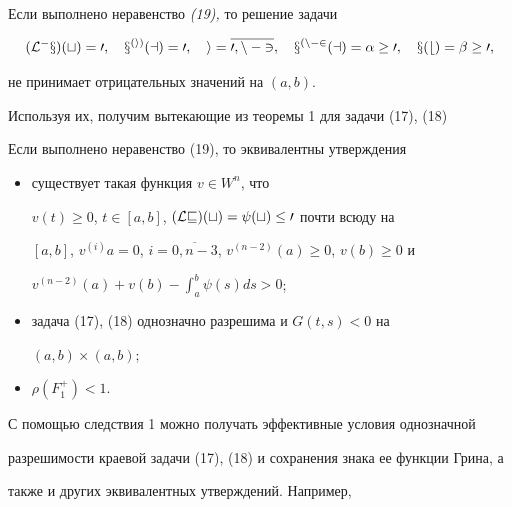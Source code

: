  


\begin{assrt} Если выполнено неравенство {\em (19),} то решение задачи 


$$ 


(\cal L^-x)(t)=0,\quad x^{(i)}(a)=0,\quad i=\overline{0,n-3}, 


\quad x^{(n-2}(a)=\alpha\ge 0,\quad x(b)=\beta\ge 0, 


$$ 


не принимает отрицательных значений на $(a,b)$. 


\end{assrt} 


 


Используя их, получим вытекающие из теоремы 1 для задачи (17), (18) 


 


\begin{cor} Если выполнено неравенство (19), то эквивалентны утверждения 


\begin{itemize} 


\item[1)] существует такая функция $v\in W^n$, что 


$v(t)\ge 0$, $t\in[a,b]$, $(\cal Lv)(t)=\psi(t)\le 0$ почти всюду на 


$[a,b]$, $v^{(i)}a=0$, $i=\overline{0,n-3}$, $v^{(n-2)}(a)\ge 0$, $v(b)\ge 0$ и 


$v^{(n-2)}(a)+v(b)-\int^b_a\psi(s)ds>0$;


\item[2)] задача (17), (18) однозначно разрешима и $G(t,s)<0$ на 


$(a,b)\times(a,b)$; 


\item[3)] $\rho(F^+_1)<1$. 


\end{itemize} 


\end{cor} 


 


С помощью следствия 1 можно получать эффективные условия однозначной 


разрешимости краевой задачи (17), (18) и сохранения знака ее функции Грина, а 


также и других эквивалентных утверждений. Например, 


